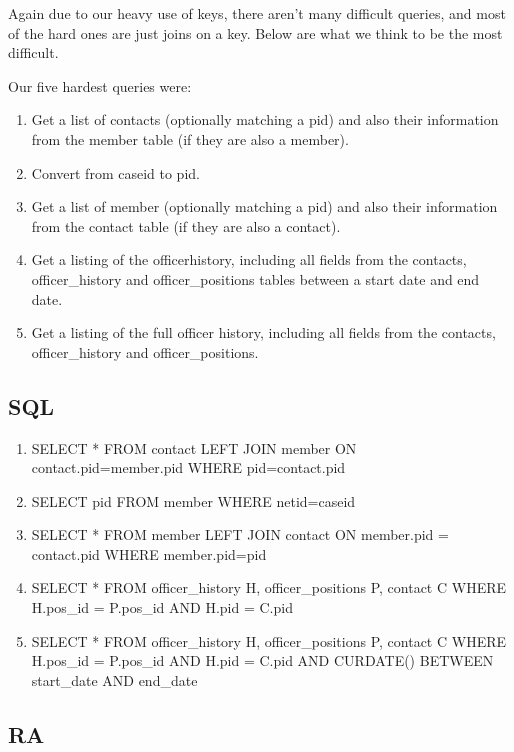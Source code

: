 \documentclass{article}
\begin{document}
Again due to our heavy use of keys, there aren't many difficult queries, and most of the hard ones are just joins on a key.  Below are what we think to be the most difficult.

Our five hardest queries were:\newline

\begin{enumerate}
\item Get a list of contacts (optionally matching a pid) and also their information from the member table (if they are also a member). 
\item Convert from caseid to pid. 
\item Get a list of member (optionally matching a pid) and also their information from the contact table (if they are also a contact). 
\item Get a listing of the officerhistory, including all fields from the contacts, officer\_history and officer\_positions tables between a start date and end date. 
\item Get a listing of the full officer history, including all fields from the contacts, officer\_history and officer\_positions. 
\end{enumerate}
\subsection{SQL}

\begin{enumerate}

\item SELECT * FROM contact LEFT JOIN member ON contact.pid=member.pid WHERE pid=contact.pid
\item SELECT pid FROM member WHERE netid=caseid
\item SELECT * FROM member LEFT JOIN contact ON member.pid = contact.pid WHERE member.pid=pid
\item SELECT * FROM officer\_history H, officer\_positions P, contact C WHERE H.pos\_id = P.pos\_id AND H.pid = C.pid
\item SELECT * FROM officer\_history H, officer\_positions P, contact C WHERE H.pos\_id = P.pos\_id AND H.pid = C.pid AND CURDATE() BETWEEN start\_date AND end\_date

\end{enumerate}

\subsection{RA}
\end{document}
